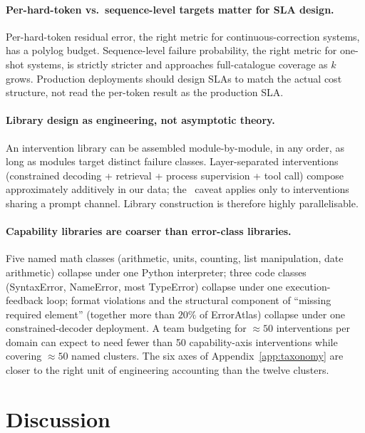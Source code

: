 \documentclass{article}
\theoremstyle{taeplain}
\theoremstyle{taedefn}
\newcommand{\teApprox}{\ensuremath{\approx}}
\begin{document}
\paragraph{Per-hard-token vs.\ sequence-level targets matter for SLA design.}
Per-hard-token residual error, the right metric for continuous-correction systems, has a polylog budget. Sequence-level failure probability, the right metric for one-shot systems, is strictly stricter and approaches full-catalogue coverage as $k$ grows. Production deployments should design SLAs to match the actual cost structure, not read the per-token result as the production SLA.

\paragraph{Library design as engineering, not asymptotic theory.}
An intervention library can be assembled module-by-module, in any order, as long as modules target distinct failure classes. Layer-separated interventions (constrained decoding + retrieval + process supervision + tool call) compose approximately additively in our data; the~\citet{le2026interaction} caveat applies only to interventions sharing a prompt channel. Library construction is therefore highly parallelisable.

\paragraph{Capability libraries are coarser than error-class libraries.}
Five named math classes (arithmetic, units, counting, list manipulation, date arithmetic) collapse under one Python interpreter; three code classes (SyntaxError, NameError, most TypeError) collapse under one execution-feedback loop; format violations and the structural component of ``missing required element'' (together more than $20\%$ of ErrorAtlas) collapse under one constrained-decoder deployment. A team budgeting for $\teApprox 50$ interventions per domain can expect to need fewer than 50 capability-axis interventions while covering $\teApprox 50$ named clusters. The six axes of Appendix~\ref{app:taxonomy} are closer to the right unit of engineering accounting than the twelve clusters.

\section{Discussion}
\label{sec:discussion}
\end{document}
